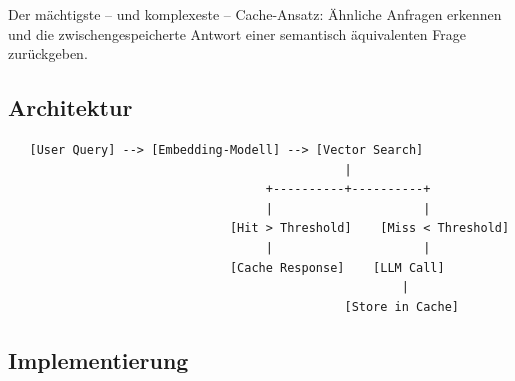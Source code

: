 Der mächtigste -- und komplexeste -- Cache-Ansatz: Ähnliche Anfragen erkennen und die zwischengespeicherte Antwort einer semantisch äquivalenten Frage zurückgeben.

\subsection{Architektur}

\begin{verbatim}
   [User Query] --> [Embedding-Modell] --> [Vector Search]
                                               |
                                    +----------+----------+
                                    |                     |
                               [Hit > Threshold]    [Miss < Threshold]
                                    |                     |
                               [Cache Response]    [LLM Call]
                                                       |
                                               [Store in Cache]
\end{verbatim}

\subsection{Implementierung}


